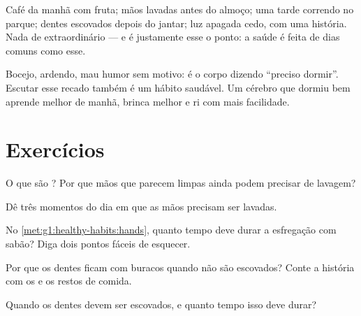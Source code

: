 \begin{example}\label{ex:g1:healthy-habits:day}
Café da manhã com fruta; mãos lavadas antes do almoço; uma tarde
correndo no parque; dentes escovados depois do jantar; luz apagada
cedo, com uma história. Nada de extraordinário --- e é justamente
esse o ponto: a saúde é feita de dias comuns como esse.
\end{example}

\begin{remark}\label{rem:g1:healthy-habits:tired}
Bocejo,  ardendo, mau humor sem motivo: é o corpo dizendo
``preciso dormir''. Escutar esse recado também é um hábito saudável.
Um cérebro que dormiu bem aprende melhor de manhã, brinca melhor e
ri com mais facilidade.
\end{remark}

\section{Exercícios}

\begin{exercise}[$\star$]\label{exo:g1:healthy-habits:1}
O que são ? Por que mãos que parecem limpas ainda podem
precisar de lavagem?
\end{exercise}

\begin{exercise}[$\star$]\label{exo:g1:healthy-habits:2}
Dê três momentos do dia em que as mãos precisam ser lavadas.
\end{exercise}

\begin{exercise}[$\star$]\label{exo:g1:healthy-habits:3}
No \cref{met:g1:healthy-habits:hands}, quanto tempo deve durar a
esfregação com sabão? Diga dois pontos fáceis de esquecer.
\end{exercise}

\begin{exercise}[$\star$]\label{exo:g1:healthy-habits:4}
Por que os dentes ficam com buracos quando não são escovados? Conte
a história com os  e os restos de comida.
\end{exercise}

\begin{exercise}[$\star$]\label{exo:g1:healthy-habits:5}
Quando os dentes devem ser escovados, e quanto tempo isso deve durar?
\end{exercise}


